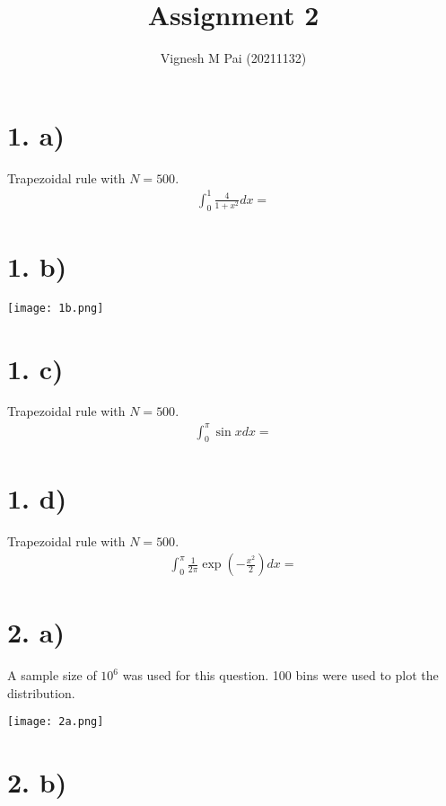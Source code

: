 \documentclass{article}
\title{Assignment 2}
\author{Vignesh M Pai (20211132)}
\date{}
\begin{document}
\maketitle

\section*{1. a)}

Trapezoidal rule with $N = 500$.
\begin{align*}
    \int_0^1 \frac{4}{1 + x^2} dx = 
\end{align*}

\section*{1. b)}

\begin{center}
    \texttt{[image: 1b.png]}
\end{center}

\section*{1. c)}

Trapezoidal rule with $N = 500$.
\begin{align*}
    \int_0^\pi \sin x dx = 
\end{align*}

\section*{1. d)}

Trapezoidal rule with $N = 500$.
\begin{align*}
    \int_0^\pi \frac{1}{2\pi} \exp\left(-\frac{x^2}{2}\right) dx = 
\end{align*}

\section*{2. a)}

A sample size of $10^6$ was used for this question. 100 bins were used to plot the distribution.
\begin{center}
    \texttt{[image: 2a.png]}
\end{center}

\section*{2. b)}
\end{document}

